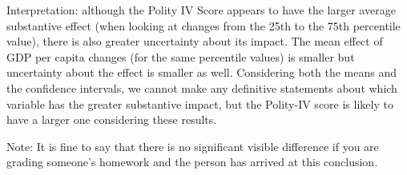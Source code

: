 \documentclass[12pt]{article}\usepackage[]{graphicx}\usepackage[]{color}
\begin{document}
Interpretation: although the Polity IV Score appears to have the larger average substantive effect (when looking at changes from the 25th to the 75th percentile value), there is also greater uncertainty about its impact. The mean effect of GDP per capita changes (for the same percentile values) is smaller but uncertainty about the effect is smaller as well. Considering both the means and the confidence intervals, we cannot make any definitive statements about which variable has the greater substantive impact, but the Polity-IV score is likely to have a larger one considering these results.

Note: It is fine to say that there is no significant visible difference if you are grading someone's homework and the person has arrived at this conclusion.
\end{document}
